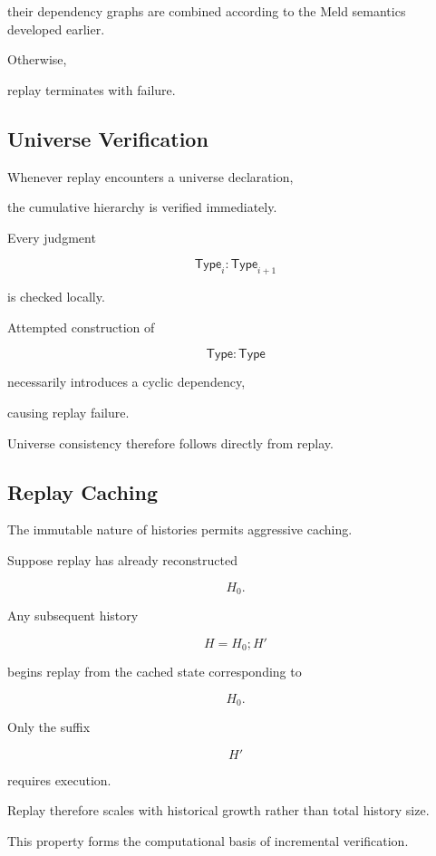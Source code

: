 \documentclass[12pt,oneside]{article}
\theoremstyle{definition}
\theoremstyle{remark}
\newcommand{\Type}{\mathsf{Type}}
\begin{document}
their dependency graphs are combined according to the Meld semantics developed
earlier.

Otherwise,

replay terminates with failure.


\subsection{Universe Verification}

Whenever replay encounters a universe declaration,

the cumulative hierarchy is verified immediately.

Every judgment

\[
\Type_i
:
\Type_{i+1}
\]

is checked locally.

Attempted construction of

\[
\Type
:
\Type
\]

necessarily introduces a cyclic dependency,

causing replay failure.

Universe consistency therefore follows directly from replay.


\subsection{Replay Caching}

The immutable nature of histories permits aggressive caching.

Suppose replay has already reconstructed

\[
H_0.
\]

Any subsequent history

\[
H
=
H_0;
H'
\]

begins replay from the cached state corresponding to

\[
H_0.
\]

Only the suffix

\[
H'
\]

requires execution.

Replay therefore scales with historical growth rather than total history size.

This property forms the computational basis of incremental verification.

\end{document}
